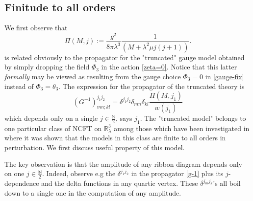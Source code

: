 \documentclass[11pt]{book}
\theoremstyle{break}
\begin{document}
\subsection*{Finitude to all orders}\label{subsection33}


We first observe that 
%
\begin{equation}
\Pi(M,j) := \frac{g^2}{8\pi\lambda^3}\frac{1}{(M+\lambda^2\mu j(j+1))}.\label{Pi}
\end{equation}
%
is related obviously to the propagator for the "truncated" gauge model obtained by simply dropping the field $\Phi_3$ in the action \eqref{zeta=0}. Notice that this latter {\it{formally}} may be viewed as resulting from the gauge choice $\Phi_3=0$ in \eqref{gauge-fix} instead of $\Phi_3=\theta_3$. The expression for the propagator of the truncated theory is 
%
\begin{equation}
(G^{-1})^{j_1j_2}_{mn;kl}=\delta^{j_1j_2}\delta_{mn}\delta_{kl}\frac{\Pi(M,j_1)}{w(j_1)}\label{g-1}
\end{equation}
%
which depends only on a single $j\in\frac{\mathbb{N}}{2}$, says $j_1$. The "truncated model" belongs to one particular class of NCFT on $\mathbb{R}^3_\lambda$ among those which have been investigated in \cite{vitale_noncommutative_2013} where it was shown that the models in this class are finite to all orders in perturbation. We first discuss useful property of this model.


The key observation is that the amplitude of any ribbon diagram depends only on one $j\in\frac{\mathbb{N}}{2}$. Indeed, observe e.g the $\delta^{j_1j_2}$ in the propagator \eqref{g-1} plus its $j$-dependence and the delta functions in any quartic vertex. These $\delta^{j_mj_k}$'s all boil down to a single one in the computation of any amplitude.\\
\end{document}
